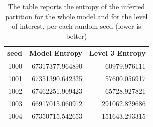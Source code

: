 \begin{table}[tb]
\caption[Model and level entropy]{The table reports the entropy of the inferred partition for the whole model and for the level of interest, per each random seed (lower is better)}
\label{tab:entropy}
\begin{tabular}{rrr}
\toprule
seed & Model Entropy & Level 3 Entropy \\
\midrule
1000 & 67317377.964890 & 60979.976111 \\
1001 & 67351390.642325 & 57600.056917 \\
1002 & 67462251.909423 & 65728.927821 \\
1003 & 66917015.060912 & 291062.829686 \\
1004 & 67350715.542653 & 151643.293315 \\
\bottomrule
\end{tabular}
\end{table}
